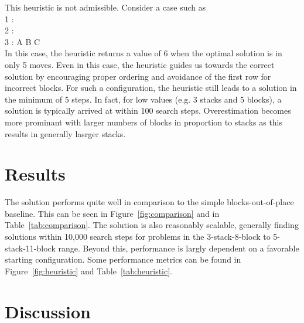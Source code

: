 \documentclass{article}
\begin{document}
This heuristic is not admissible. Consider a case such as\\
\textsc{1 :}\\
\textsc{2 :}\\
\textsc{3 : A B C}\\
In this case, the heuristic returns a value of 6 when the optimal solution is
in only 5 moves. Even in this case, the heuristic guides us towards the correct
solution by encouraging proper ordering and avoidance of the first row for
incorrect blocks. For such a configuration, the heuristic still leads to a
solution in the minimum of 5 steps. In fact, for low values (e.g. 3 stacks 
and 5 blocks), a solution is typically arrived at within 100 search steps. 
Overestimation becomes more prominant with larger numbers of blocks in proportion 
to stacks as this results in generally lasrger stacks.


\section{Results}

The solution performs quite well in comparison to the simple
blocks-out-of-place baseline. This can be seen in Figure~\ref{fig:comparison}
and in Table~\ref{tab:comparison}. The solution is also reasonably scalable,
generally finding solutions within 10,000 search steps for problems in the
3-stack-8-block to 5-stack-11-block range. Beyond this, performance is largly
dependent on a favorable starting configuration. Some performance metrics can be
found in Figure~\ref{fig:heuristic} and Table~\ref{tab:heuristic}.


\section{Discussion}
\end{document}
